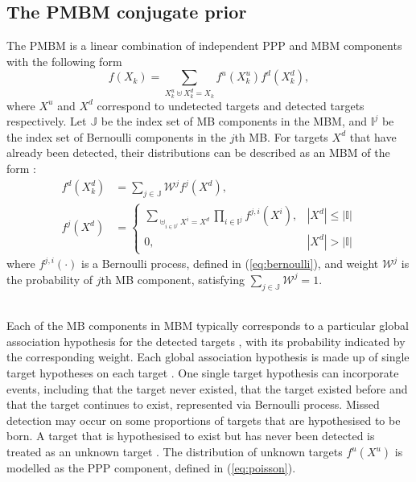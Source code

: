 \subsection{The PMBM conjugate prior}
The PMBM is a linear combination of independent PPP and MBM components with the following form
\begin{equation}
    f(X_k) = \sum_{X_k^u\uplus X_k^d=X_k}f^{u}(X_k^u)f^{d}(X_k^d),
\label{eq:pmbm}
\end{equation}
where $X^u$ and $X^d$ correspond to undetected targets and detected targets respectively. Let $\mathbb{J}$ be the index set of MB components in the MBM, and $\mathbb{I}^j$ be the index set of Bernoulli components in the $j$th MB. For targets $X^d$ that have already been detected, their distributions can be described as an MBM of the form \cite{pmbmextended2}:
\begin{subequations}
\begin{align}
    f^{d}(X^d_k) &= \sum_{j\in\mathbb{J}}\mathcal{W}^jf^j(X^d),\\
    f^j(X^d) &= \begin{cases}
\sum_{\uplus_{i\in\mathbb{I}^j}X^i=X^d}\prod_{i\in\mathbb{I}^j}f^{j,i}(X^i), & |X^d| \leq |\mathbb{I}| \\
0, & |X^d| > |\mathbb{I}|
\end{cases}
\end{align}
\label{eq:mbm}
\end{subequations}
where $f^{j,i}(\cdot)$ is a Bernoulli process, defined in (\ref{eq:bernoulli}), and weight $\mathcal{W}^j$ is the probability of $j$th MB component, satisfying $\sum_{j\in\mathbb{J}}\mathcal{W}^j = 1$.


~\\
Each of the MB components in MBM typically corresponds to a particular global association hypothesis for the detected targets \cite{pmbmpoint}, with its probability indicated by the corresponding weight. Each global association hypothesis is made up of single target hypotheses on each target \cite{pmbmpoint}. One single target hypothesis can incorporate events, including that the target never existed, that the target existed before and that the target continues to exist, represented via Bernoulli process. Missed detection may occur on some proportions of targets that are hypothesised to be born. A target that is hypothesised to exist but has never been detected is treated as an unknown target \cite{pmbmpoint}. The distribution of unknown targets $f^u(X^u)$ is modelled as the PPP component, defined in (\ref{eq:poisson}).

